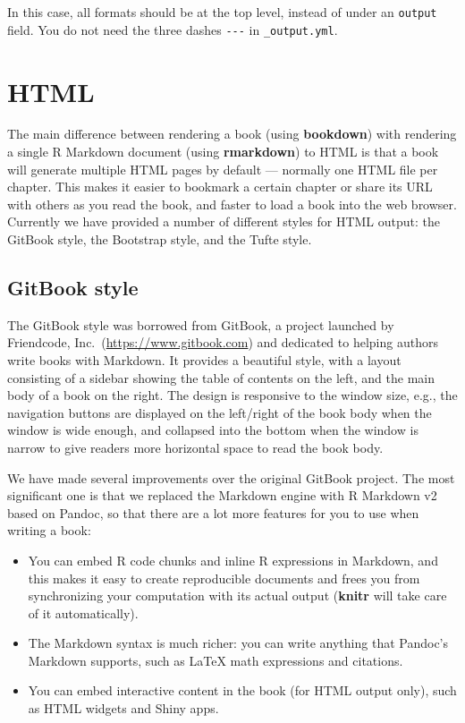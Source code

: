 \documentclass[
  12pt,
]{krantz}
\providecommand{\tightlist}{%
  \setlength{\itemsep}{0pt}\setlength{\parskip}{0pt}}
\theoremstyle{definition}
\theoremstyle{definition}
\theoremstyle{definition}
\theoremstyle{definition}
\theoremstyle{remark}
\begin{document}
In this case, all formats should be at the top level, instead of under an \texttt{output} field. You do not need the three dashes \texttt{-\/-\/-} in \texttt{\_output.yml}.

\hypertarget{html}{%
\section{HTML}\label{html}}

The main difference between rendering a book (using \textbf{bookdown}) with rendering a single R Markdown document (using \textbf{rmarkdown}) to HTML is that a book will generate multiple HTML pages by default --- normally one HTML file per chapter. This makes it easier to bookmark a certain chapter or share its URL with others as you read the book, and faster to load a book into the web browser. Currently we have provided a number of different styles for HTML output: the GitBook style, the Bootstrap style, and the Tufte style.

\hypertarget{gitbook-style}{%
\subsection{GitBook style}\label{gitbook-style}}

The GitBook style was borrowed from GitBook, a project launched by Friendcode, Inc.~(\url{https://www.gitbook.com}) and dedicated to helping authors write books with Markdown. It provides a beautiful style, with a layout consisting of a sidebar showing the table of contents on the left, and the main body of a book on the right. The design is responsive to the window size, e.g., the navigation buttons are displayed on the left/right of the book body when the window is wide enough, and collapsed into the bottom when the window is narrow to give readers more horizontal space to read the book body.

We have made several improvements over the original GitBook project. The most significant one is that we replaced the Markdown engine with R Markdown v2 based on Pandoc, so that there are a lot more features for you to use when writing a book:

\begin{itemize}
\tightlist
\item
  You can embed R code chunks and inline R expressions in Markdown, and this makes it easy to create reproducible documents and frees you from synchronizing your computation with its actual output (\textbf{knitr} will take care of it automatically).
\item
  The Markdown syntax is much richer: you can write anything that Pandoc's Markdown supports, such as LaTeX math expressions and citations.
\item
  You can embed interactive content in the book (for HTML output only), such as HTML widgets and Shiny apps.
\end{itemize}
\end{document}

